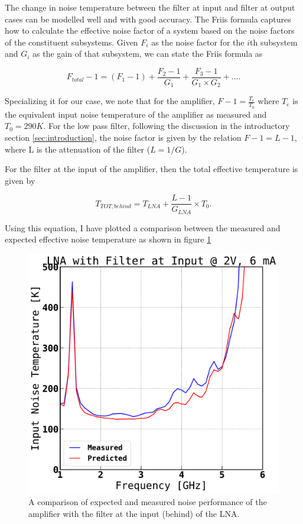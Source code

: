 \documentclass[twocolumn, aps, floatfix]{revtex4-1}
\begin{document}
The change in noise temperature between the filter at input and filter at output cases can be modelled well and with good accuracy. The Friis formula captures how to calculate the effective noise factor of a system based on the noise factors of the constituent subsystems. Given $F_i$ as the noise factor for the $i$th subsystem and $G_i$ as the gain of that subsystem, we can state the Friis formula as

    \begin{equation}
        F_{total} - 1 = (F_1 - 1) + \frac{F_2 - 1}{G_1} + \frac{F_3 - 1}{G_1 \times G_2} + \ldots.  
    \end{equation} 

    Specializing it for our case, we note that for the amplifier, $F - 1 = \frac{T_e}{T_0}$ where $T_e$ is the equivalent input noise temperature of the amplifier as measured and $T_0 = 290 K$. For the low pass filter, following the discussion in the introductory section \ref{sec:introduction}, the noise factor is given by the relation $F - 1 = L - 1$, where L is the attenuation of the filter ($L = 1/G$).

    For the filter at the input of the amplifier, then the total effective temperature is given by

    \begin{equation}
        T_{TOT, behind} = T_{LNA} + \frac{L - 1}{G_{LNA}} \times T_0.
    \end{equation}

    Using this equation, I have plotted a comparison between the measured and expected effective noise temperature as shown in figure \ref{fig:behindnoisetemp}
    
    \begin{figure}[!htbp]
    \centering
    \includegraphics[scale=0.3]{Filter_behind_noisetemp.pdf}
    \caption{A comparison of expected and measured noise performance of the amplifier with the filter at the input (behind) of the LNA.}
    \label{fig:behindnoisetemp}
    \end{figure}
\end{document}
